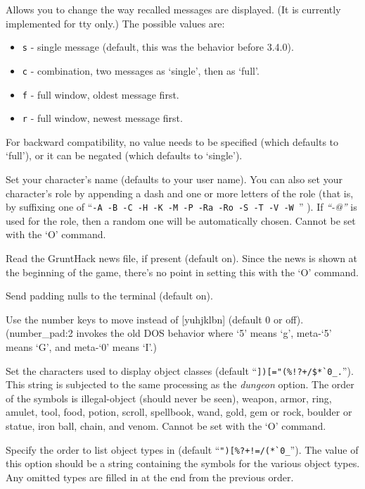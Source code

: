 Allows you to change the way recalled messages are displayed.
(It is currently implemented for tty only.)
The possible values are:
\begin{itemize}
\item {\tt s} - single message (default, this was the behavior before 3.4.0).
\item {\tt c} - combination, two messages as `single', then as `full'.
\item {\tt f} - full window, oldest message first.
\item {\tt r} - full window, newest message first.
\end{itemize}
For backward compatibility, no value needs to be specified (which
defaults to `full'), or it can be negated (which defaults to `single').
\item[\tb{``name    ''}]
Set your character's name (defaults to your user name).  You can also
set your character's role by appending a dash and one or more letters of
the role (that is, by suffixing one of
``{\tt -A -B -C -H -K -M -P -Ra -Ro -S -T -V -W }'' ).
If
{\it ``-@'' }
is used for the role, then a random one will be automatically chosen.
Cannot be set with the `O' command.
\item[\tb{``news    ''}]
Read the GruntHack news file, if present (default on).
Since the news is shown at the beginning of the game, there's no point
in setting this with the `O' command.
\item[\tb{``null    ''}]
Send padding nulls to the terminal (default on).
\item[\tb{number\_pad}]
Use the number keys to move instead of [yuhjklbn] (default 0 or off).
(number\_pad:2 invokes the old DOS behavior where `5' means `g', meta-`5'
means `G',  and meta-`0' means `I'.)
\item[\tb{objects}]
Set the characters used to display object classes
 (default
``\verb&])[="(%!?+/$*`0_.&'').
This string is subjected to the same processing as the
{\it dungeon }
option.
The order of the symbols is
illegal-object (should never be seen), weapon, armor, ring, amulet, tool,
food, potion, scroll, spellbook, wand, gold, gem or rock, boulder or statue,
iron ball, chain, and venom.
Cannot be set with the `O' command.
\item[\tb{packorder}]
Specify the order to list object types in (default
``\verb&")[%?+!=/(*`0_&''). The value of this option should be a string
containing the symbols for the various object types.  Any omitted types
are filled in at the end from the previous order.
\item[\ib{paranoid\_hit}]
